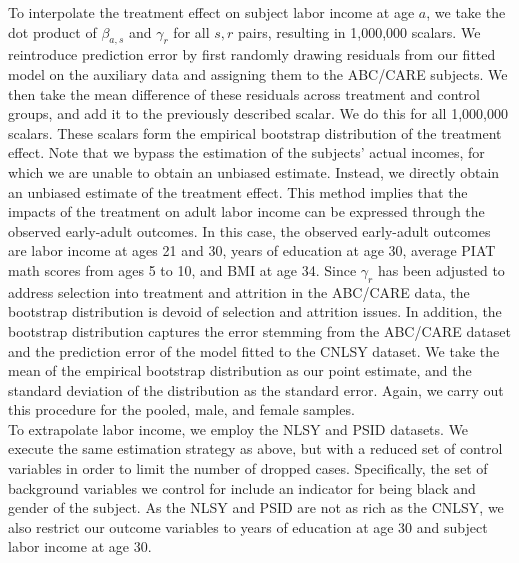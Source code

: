 \noindent To interpolate the treatment effect on subject labor income at age $a$, we take the dot product
of $\beta_{a, s}$ and $\gamma_r$ for all $s,r$ pairs, resulting in 1,000,000 scalars. We reintroduce
prediction error by first randomly drawing residuals from our fitted model on the auxiliary data and assigning
them to the ABC/CARE subjects. We then take the mean difference of these residuals across treatment and control
groups, and add it to the previously described scalar. We do this for all 1,000,000 scalars. These scalars form the empirical
bootstrap distribution of the treatment effect. Note that
we bypass the estimation of the subjects' actual incomes, for which we are unable to obtain an
unbiased estimate. Instead, we directly obtain an unbiased estimate of the treatment effect. This
method implies that the impacts of the treatment on adult labor income can be expressed through
the observed early-adult outcomes. In this case, the observed early-adult outcomes are labor income at ages 21 and
30, years of education at age 30, average PIAT math scores from ages 5 to 10, and BMI at age 34. Since $\gamma_r$ has
been adjusted to address selection into treatment and attrition in the ABC/CARE data, the bootstrap distribution
is devoid of selection and attrition issues. In addition, the bootstrap distribution captures
the error stemming from the ABC/CARE dataset and the prediction error of the model fitted to the CNLSY dataset.
We take the mean of the empirical bootstrap distribution as our point estimate, and the standard deviation
of the distribution as the standard error. Again, we carry out this procedure for the
pooled, male, and female samples. \\

\noindent To extrapolate labor income, we employ the NLSY and PSID datasets. We execute the same estimation
strategy as above, but with a reduced set of control variables in order to limit the number
of dropped cases. Specifically, the set of background variables we control for include an indicator for
being black and gender of the subject. As the NLSY and PSID are not as rich as the CNLSY, we also
restrict our outcome variables to years of education at age 30 and subject labor income at age 30. \\

